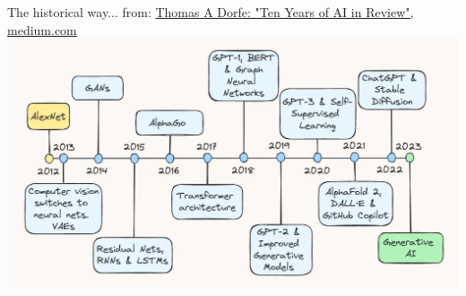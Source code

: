 \documentclass[10pt,serif,mathserif,compress,hyperref={colorlinks}]{beamer}
\begin{document}
\begin{frame}{The historical way...}
  \hspace*{-2mm}from: \href{https://towardsdatascience.com/ten-years-of-ai-in-review-85decdb2a540}
    {Thomas A Dorfe: "Ten Years of AI in Review", medium.com}\\[1mm]
  \hspace*{-6mm}\includegraphics[width=1.1\textwidth]{images/Ten Years of AI in Review.png}
\end{frame}
\end{document}
